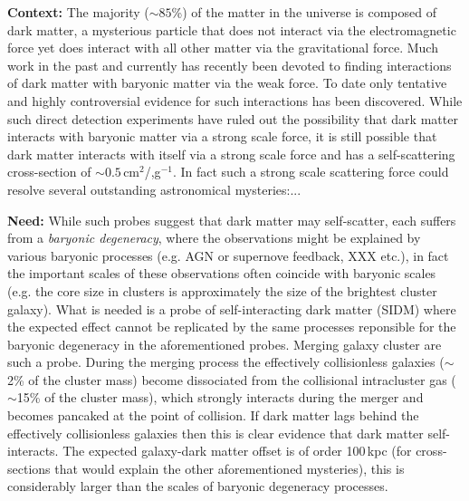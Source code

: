 
\noindent\textbf{Context:} 
The majority ($\sim85$\%) of the matter in the universe is composed of dark matter, a mysterious particle that does not interact via the electromagnetic force yet does interact with all other matter via the gravitational force.
Much work in the past and currently has recently been devoted to finding interactions of dark matter with baryonic matter via the weak force.
To date only tentative and highly controversial evidence for such interactions has been discovered.
While such direct detection experiments have ruled out the possibility that dark matter interacts with baryonic matter via a strong scale force, it is still possible that dark matter interacts with itself via a strong scale force and has a self-scattering cross-section of $\sim0.5$\,cm$^2$/,g$^{-1}$.
In fact such a strong scale scattering force could resolve several outstanding astronomical mysteries:...
 


\noindent\textbf{Need:} 
While such probes suggest that dark matter may self-scatter, each suffers from a \emph{baryonic degeneracy}, where the observations might be explained by various baryonic processes (e.g. AGN or supernove feedback, XXX etc.), in fact the important scales of these observations often coincide with baryonic scales (e.g. the core size in clusters is approximately the size of the brightest cluster galaxy).
What is needed is a probe of self-interacting dark matter (SIDM) where the expected effect cannot be replicated by the same processes reponsible for the baryonic degeneracy in the aforementioned probes.
Merging galaxy cluster are such a probe.
During the merging process the effectively collisionless galaxies ($\sim$2\% of the cluster mass) become dissociated from the collisional intracluster gas ($\sim$15\% of the cluster mass), which strongly interacts during the merger and becomes pancaked at the point of collision.
If dark matter lags behind the effectively collisionless galaxies then this is clear evidence that dark matter self-interacts.
The expected galaxy-dark matter offset is of order 100\,kpc (for cross-sections that would explain the other aforementioned mysteries), this is considerably larger than the scales of baryonic degeneracy processes.

